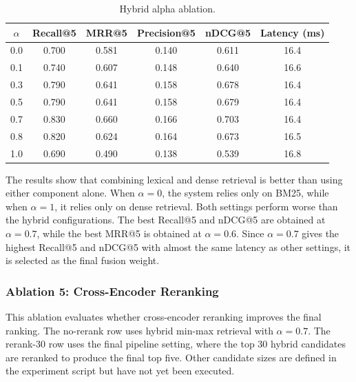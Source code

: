 \documentclass[11pt,a4paper]{article}
\begin{document}
\begin{table}[H]
\centering
\caption{Hybrid alpha ablation.}
\label{tab:alpha}
\begin{tabular}{cccccc}
\toprule
$\alpha$ & Recall@5 & MRR@5 & Precision@5 & nDCG@5 & Latency (ms) \\
\midrule
0.0 & 0.700 & 0.581 & 0.140 & 0.611 & 16.4 \\

0.1 & 0.740 & 0.607 & 0.148 & 0.640 & 16.6 \\

0.3 & 0.790 & 0.641 & 0.158 & 0.678 & 16.4 \\

0.5 & 0.790 & 0.641 & 0.158 & 0.679 & 16.4 \\

0.7 & 0.830 & 0.660 & 0.166 & 0.703 & 16.4 \\

0.8 & 0.820 & 0.624 & 0.164 & 0.673 & 16.5 \\

1.0 & 0.690 & 0.490 & 0.138 & 0.539 & 16.8 \\
\bottomrule
\end{tabular}
\end{table}

The results show that combining lexical and dense retrieval is better than using either component alone. When $\alpha=0$, the system relies only on BM25, while when $\alpha=1$, it relies only on dense retrieval. Both settings perform worse than the hybrid configurations. The best Recall@5 and nDCG@5 are obtained at $\alpha=0.7$, while the best MRR@5 is obtained at $\alpha=0.6$. Since $\alpha=0.7$ gives the highest Recall@5 and nDCG@5 with almost the same latency as other settings, it is selected as the final fusion weight.

\subsubsection{Ablation 5: Cross-Encoder Reranking}

This ablation evaluates whether cross-encoder reranking improves the final
ranking. The no-rerank row uses hybrid min-max retrieval with $\alpha=0.7$.
The rerank-30 row uses the final pipeline setting, where the top 30 hybrid
candidates are reranked to produce the final top five. Other candidate sizes are
defined in the experiment script but have not yet been executed.
\end{document}
